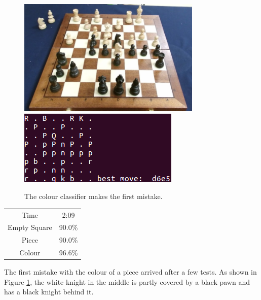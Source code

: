 \documentclass{l4proj}
\begin{document}
\vspace{20mm}
\begin{figure}[h!]
\includegraphics[scale=0.8]{ts/ts6.png} \includegraphics[scale=0.75]{ts/tsd6.png}
\caption{The colour classifier makes the first mistake.}
\label{ts6}
\end{figure}
\vspace{5mm}

\begin{table}[h!]
\centering
\begin{tabular}{|c|c|}
	\hline
	Time & 2:09 \\
	\rowcolor{brown!45}Empty Square & 90.0\%  \\
	Piece & 90.0\% \\
	\rowcolor{brown!45} Colour & 96.6\% \\
	\hline
\end{tabular}
\end{table}

The first mistake with the colour of a piece arrived after a few tests. As shown in Figure \ref{ts6}, the white knight in the middle is partly covered by a black pawn and has a black knight behind it. 
\end{document}
